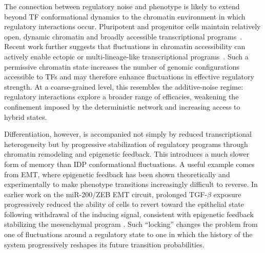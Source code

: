\documentclass[11pt]{article}
\begin{document}
The connection between regulatory noise and phenotype is likely to extend beyond TF conformational dynamics to the chromatin environment in which regulatory interactions occur. Pluripotent and progenitor cells maintain relatively open, dynamic chromatin and broadly accessible transcriptional programs~\cite{Meshorer2006HyperdynamicCells, Efroni2008GlobalCells}. Recent work further suggests that fluctuations in chromatin accessibility can actively enable ectopic or multi-lineage-like transcriptional programs~\cite{Gamble2025}. Such a permissive chromatin state increases the number of genomic configurations accessible to TFs and may therefore enhance fluctuations in effective regulatory strength. At a coarse-grained level, this resembles the additive-noise regime: regulatory interactions explore a broader range of efficacies, weakening the confinement imposed by the deterministic network and increasing access to hybrid states.

Differentiation, however, is accompanied not simply by reduced transcriptional heterogeneity but by progressive stabilization of regulatory programs through chromatin remodeling and epigenetic feedback. This introduces a much slower form of memory than IDP conformational fluctuations. A useful example comes from EMT, where epigenetic feedback has been shown theoretically and experimentally to make phenotype transitions increasingly difficult to reverse. In earlier work on the miR-200/ZEB EMT circuit, prolonged TGF-$\beta$ exposure progressively reduced the ability of cells to revert toward the epithelial state following withdrawal of the inducing signal, consistent with epigenetic feedback stabilizing the mesenchymal program \cite{Jia2019, Jia2020EpigeneticEMT}. Such ``locking'' changes the problem from one of fluctuations around a regulatory state to one in which the history of the system progressively reshapes its future transition probabilities.
\end{document}
